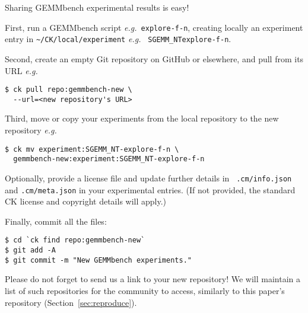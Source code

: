\documentclass{acm_proc_article-sp} %
\begin{document}
Sharing GEMMbench experimental results is easy!

First, run a GEMMbench script {\em e.g.}\ {\tt explore-f-n}, creating locally
an experiment entry in \verb|~/CK/local/experiment| {\em e.g.} {\tt
SGEMM\_NT\-explore-f-n}.

Second, create an empty Git repository on GitHub or elsewhere, and pull from
its URL {\em e.g.}\
%
\begin{verbatim}
$ ck pull repo:gemmbench-new \
  --url=<new repository's URL>
\end{verbatim}
%

Third, move or copy your experiments from the local repository to the new repository {\em e.g.}\
%
\begin{verbatim}
$ ck mv experiment:SGEMM_NT-explore-f-n \
  gemmbench-new:experiment:SGEMM_NT-explore-f-n
\end{verbatim}
%

Optionally, provide a license file and update further details in {\tt
.cm/info.json} and {\tt .cm/meta.json} in your experimental entries.
%
(If not provided, the standard CK license and copyright details will apply.)

Finally, commit all the files:
%
\begin{verbatim}
$ cd `ck find repo:gemmbench-new`
$ git add -A
$ git commit -m "New GEMMbench experiments."
\end{verbatim}
%

Please do not forget to send us a link to your new repository! We will maintain a list
of such repositories for the community to access, similarly to this paper's
repository (Section~\ref{sec:reproduce}).

\balancecolumns
\end{document}
